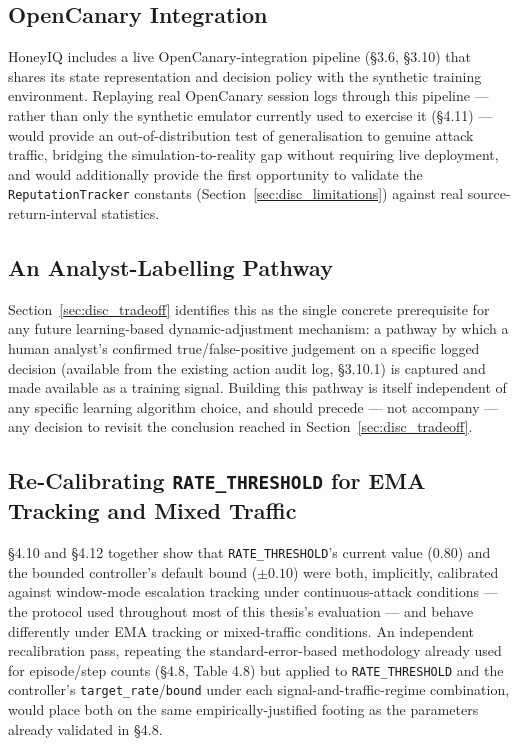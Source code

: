 \subsection{OpenCanary Integration}

HoneyIQ includes a live OpenCanary-integration pipeline (\S3.6, \S3.10)
that shares its state representation and decision policy with the
synthetic training environment.
Replaying real OpenCanary session logs through this pipeline --- rather
than only the synthetic emulator currently used to exercise it (\S4.11) ---
would provide an out-of-distribution test of generalisation to genuine
attack traffic, bridging the simulation-to-reality gap without requiring
live deployment, and would additionally provide the first opportunity to
validate the \texttt{ReputationTracker} constants
(Section~\ref{sec:disc_limitations}) against real source-return-interval
statistics.

\subsection{An Analyst-Labelling Pathway}

Section~\ref{sec:disc_tradeoff} identifies this as the single concrete
prerequisite for any future learning-based dynamic-adjustment mechanism: a
pathway by which a human analyst's confirmed true/false-positive judgement
on a specific logged decision (available from the existing action audit
log, \S3.10.1) is captured and made available as a training signal.
Building this pathway is itself independent of any specific learning
algorithm choice, and should precede --- not accompany --- any decision to
revisit the conclusion reached in Section~\ref{sec:disc_tradeoff}.

\subsection{Re-Calibrating \texttt{RATE\_THRESHOLD} for EMA Tracking and
Mixed Traffic}

\S4.10 and \S4.12 together show that \texttt{RATE\_THRESHOLD}'s current
value (0.80) and the bounded controller's default bound ($\pm 0.10$) were
both, implicitly, calibrated against window-mode escalation tracking under
continuous-attack conditions --- the protocol used throughout most of this
thesis's evaluation --- and behave differently under EMA tracking or
mixed-traffic conditions.
An independent recalibration pass, repeating the standard-error-based
methodology already used for episode/step counts (\S4.8, Table 4.8) but
applied to \texttt{RATE\_THRESHOLD} and the controller's
\texttt{target\_rate}/\texttt{bound} under each signal-and-traffic-regime
combination, would place both on the same empirically-justified footing as
the parameters already validated in \S4.8.
